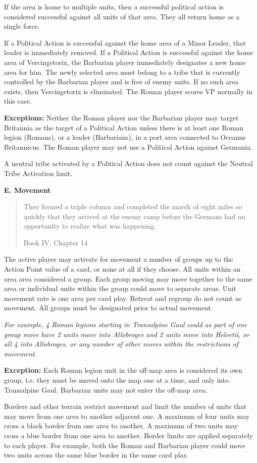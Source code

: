 If the area is home to multiple units, then a successful political action is considered successful against all units of that area. They all return home as a single force.

If a Political Action is successful against the home area of a Minor Leader, that leader is immediately removed. If a Political Action is successful  against the home area of Vercingetorix, the Barbarian player immediately designates a new home area for him. The newly selected area must belong to a tribe that is currently controlled by the Barbarian player and is free of enemy units. If no such area exists, then Vercingetorix is eliminated. The Roman player scores VP normally in this case.

\textbf{Exceptions:} Neither the Roman player nor the Barbarian player may target Britannia as the target of a Political Action unless there is at least one Roman legion (Romans), or a leader (Barbarians), in a port area connected to Oceanus Britannicus. The Roman player may not use a Political Action against Germania.

A neutral tribe activated by a Political Action does not count against the Neutral Tribe Activation limit.

\textbf{E. Movement}
\blockquote[Book IV, Chapter 14]{They formed a triple column and completed the march of eight miles so quickly that they arrived at the enemy camp before the Germans had an opportunity to realize what was happening.}
\par
The active player may activate for movement a number of groups up to the Action Point value of a card, or none at all if they choose. All units within an area area considered a group. Each group moving may move together to the same area or individual units within the group could move to separate areas. Unit movement rate is one area per card play. Retreat and regroup do not count as movement. All groups must be designated prior to actual movement.

\textit{For example, 4 Roman legions starting in Transalpine Gaul could as part of one group move have 2 units move into Allobroges and 2 units move into Helvetii, or all 4 into Allobroges, or any number of other moves within the restrictions of movement.}

\textbf{Exception:} Each Roman legion unit in the off-map area is considered its own group, i.e. they must be moved onto the map one at a time, and only into Transalpine Gaul. Barbarian units may not enter the off-map area.
\par
Borders and other terrain restrict movement and limit the number of units that may move from one area to another adjacent one. A maximum of four units may cross a black border from one area to another. A maximum of two units may cross a blue border from one area to another. Border limits are applied separately to each player. For example, both the Roman and Barbarian player could move two units across the same blue border in the same card play.

